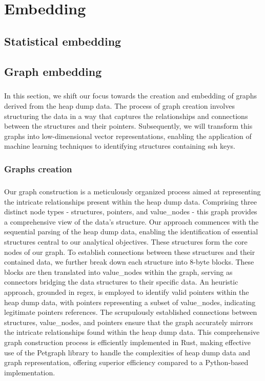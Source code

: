 \chapter{Embedding}\label{chap:embedding}

\section{Statistical embedding}
    

\section{Graph embedding}\label{sec:embedding:graph_embedding}
    \paragraph{}In this section, we shift our focus towards the creation and embedding of graphs derived from the heap dump data. The process of graph creation involves structuring the data in a way that captures the relationships and connections between the \glspl{structure} and their \glspl{pointer}. Subsequently, we will transform this graphs into low-dimensional vector representations, enabling the application of machine learning techniques to identifying \glspl{structure} containing ssh keys.

    \subsection{Graphs creation}
        \paragraph{}Our graph construction is a meticulously organized process aimed at representing the intricate relationships present within the heap dump data. Comprising three distinct node types - \glspl{structure}, \glspl{pointer}, and \glspl{value_node} - this graph provides a comprehensive view of the data's structure. Our approach commences with the sequential parsing of the heap dump data, enabling the identification of essential \glspl{structure} central to our analytical objectives. These \glspl{structure} form the core nodes of our graph. To establish connections between these \glspl{structure} and their contained data, we further break down each structure into 8-byte blocks. These blocks are then translated into \glspl{value_node} within the graph, serving as connectors bridging the data structures to their specific data. An heuristic approach, grounded in \acrshort{regex}, is employed to identify valid \glspl{pointer} within the heap dump data, with \glspl{pointer} representing a subset of \glspl{value_node}, indicating legitimate \glspl{pointer} references. The scrupulously established connections between \glspl{structure}, \glspl{value_node}, and \glspl{pointer} ensure that the graph accurately mirrors the intricate relationships found within the heap dump data. This comprehensive graph construction process is efficiently implemented in Rust, making effective use of the Petgraph library to handle the complexities of heap dump data and graph representation, offering superior efficiency compared to a Python-based implementation.

